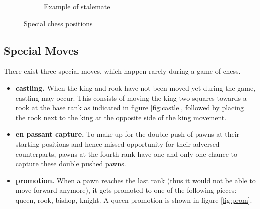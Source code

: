 \begin{figure}
\begin{subfigure}[b]{0.4\textwidth}
            \caption{Example of stalemate}
            \label{fig:stalemate2}
        \end{subfigure}
        \caption{Special chess positions}
        \label{fig:pos}

\end{figure}

\subsection{Special Moves}
\label{subsec:special_mvs}
There exist three special moves, which happen rarely during a game of chess.
\begin{itemize}
\item \textbf{castling.} When the king and rook have not been moved yet during the game, castling may occur. This consists of moving the king two squares towards a rook at the base rank as indicated in figure \ref{fig:castle}, followed by placing the rook next to the king at the opposite side of the king movement. 
\item \textbf{en passant capture.} To make up for the double push of pawns at their starting positions and hence missed opportunity for their adversed counterparts, pawns at the fourth rank have one and only one chance to capture these double pushed pawns.
\item \textbf{promotion.} When a pawn reaches the last rank (thus it would not be able to move forward anymore), it gets promoted to one of the following pieces: queen, rook, bishop, knight. A queen promotion is shown in figure \ref{fig:prom}.
\end{itemize}

